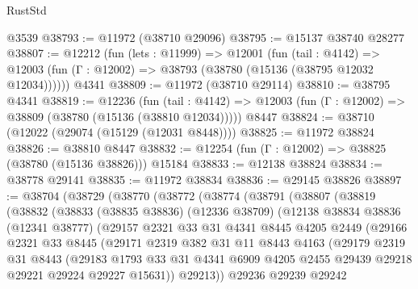 \begin{lexlean}{RustStd}
\begin{coremodule}
    @3539
@38793 := @11972 (@38710 @29096)
@38795 := @15137 @38740 @28277
@38807 := @12212
    (fun (lets : @11999) =>
    @12001
      (fun (tail : @4142) =>
      @12003 (fun (Γ : @12002) => @38793 (@38780 (@15136 (@38795 @12032 @12034))))))
    @4341
@38809 := @11972 (@38710 @29114)
@38810 := @38795 @4341
@38819 := @12236
    (fun (tail : @4142) => @12003 (fun (Γ : @12002) => @38809 (@38780 (@15136 (@38810 @12034)))))
    @8447
@38824 := @38710 (@12022 (@29074 (@15129 (@12031 @8448))))
@38825 := @11972 @38824
@38826 := @38810 @8447
@38832 := @12254 (fun (Γ : @12002) => @38825 (@38780 (@15136 @38826))) @15184
@38833 := @12138 @38824
@38834 := @38778 @29141
@38835 := @11972 @38834
@38836 := @29145 @38826
@38897 := @38704
    (@38729
      (@38770
        (@38772
          (@38774
            (@38791
              (@38807
                (@38819
                  (@38832
                    (@38833
                      (@38835 @38836)
                      (@12336 @38709)
                      (@12138
                        @38834
                        @38836
                        (@12341 @38777)
                        (@29157
                          @2321
                          @33
                          @31
                          @4341
                          @8445
                          @4205
                          @2449
                          (@29166
                            @2321
                            @33
                            @8445
                            (@29171
                              @2319
                              @382
                              @31
                              @11
                              @8443
                              @4163
                              (@29179
                                @2319
                                @31
                                @8443
                                (@29183
                                  @1793
                                  @33
                                  @31
                                  @4341
                                  @6909
                                  @4205
                                  @2455
                                  @29439
                                  @29218
                                  @29221
                                  @29224
                                  @29227
                                  @15631))
                              @29213))
                          @29236
                          @29239
                          @29242

\end{coremodule}
\end{lexlean}
